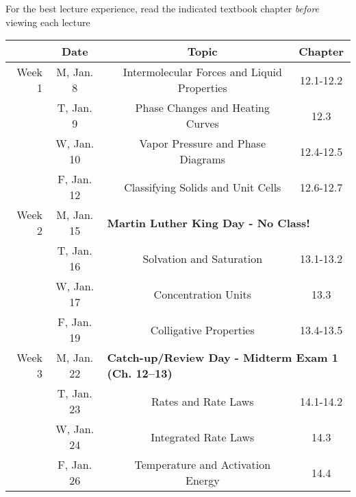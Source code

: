 \documentclass[12pt, letterpaper]{article}
\begin{document}
\noindent For the best lecture experience, read the indicated textbook chapter \emph{before} viewing each lecture

\begin{tabular}{rcccc}
& Date && Topic & Chapter\\
\midrule
Week 1 & M, Jan. 8&& Intermolecular Forces and Liquid Properties & 12.1-12.2\\
& T, Jan. 9&& Phase Changes and Heating Curves & 12.3\\
& W, Jan. 10&& Vapor Pressure and Phase Diagrams & 12.4-12.5\\
& F, Jan. 12&& Classifying Solids and Unit Cells & 12.6-12.7\\
\midrule
Week 2 & M, Jan. 15& \multicolumn{3}{l}{\textbf{Martin Luther King Day - No Class!}}\\
& T, Jan. 16&& Solvation and Saturation & 13.1-13.2\\
& W, Jan. 17&& Concentration Units & 13.3\\
& F, Jan. 19&& Colligative Properties & 13.4-13.5\\
\midrule
Week 3 & M, Jan. 22& \multicolumn{3}{l}{\textbf{Catch-up/Review Day - Midterm Exam 1 (Ch. 12--13)}}\\
& T, Jan. 23&& Rates and Rate Laws & 14.1-14.2\\
& W, Jan. 24&& Integrated Rate Laws & 14.3\\
& F, Jan. 26&& Temperature and Activation Energy & 14.4\\
\end{tabular}
\end{document}
